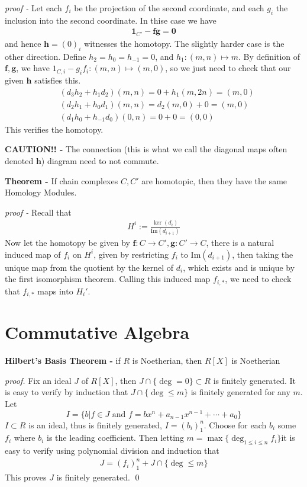 \documentclass[11pt]{article}
\theoremstyle{definition}
\newcommand{\set}[1]{\{#1\}}
\newcommand{\tand}{\text{ and }}
\newcommand{\im}{\text{Im}}
\begin{document}
    \emph{proof - } Let each \(f_i\) be the projection of the second coordinate, and each \(g_i\) the inclusion into the second coordinate. In thise case we have
    \begin{align*}
        \mathbf{1}_{C'} - \mathbf{fg} = \mathbf{0}
    \end{align*}
    and hence \(\mathbf{h} = (0)_i\) witnesses the homotopy. The slightly harder case is the other direction. Define \(h_2 = h_0 = h_{-1} = 0\), and \(h_1: (m,n) \mapsto m\). By definition of \(\mathbf{f}, \mathbf{g}\), we have \(1_{C,i} - g_if_i: (m,n) \mapsto (m,0)\), so we just need to check that our given \(\mathbf{h}\) satisfies this.
    \begin{align*}
        &(d_3h_2 + h_1d_2)(m,n) = 0 + h_1(m,2n) = (m,0) \\
        &(d_2h_1 + h_0d_1)(m,n) = d_2(m,0) + 0 = (m,0) \\
        &(d_1h_0 + h_{-1}d_0)(0,n) = 0 + 0 = (0,0)
    \end{align*}
    This verifies the homotopy.

    \textbf{CAUTION!! - } The connection (this is what we call the diagonal maps often denoted \(\mathbf{h}\)) diagram need to not commute.

    \textbf{Theorem - } If chain complexes \(C,C'\) are homotopic, then they have the same Homology Modules.

    \emph{proof - } Recall that
    \begin{align*}
        H^i := \frac{\ker(d_i)}{\im(d_{i+1})}
    \end{align*}
    Now let the homotopy be given by \(\mathbf{f}:C \to C', \mathbf{g}:C' \to C\), there is a natural induced map of \(f_i\) on \(H^i\), given by restricting \(f_i\) to \(\im(d_{i+1})\), then taking the unique map from the quotient by the kernel of \(d_i\), which exists and is unique by the first isomorphism theorem. Calling this induced map \(f_{i,*}\), we need to check that
    \(f_{i,*}\) maps into \(H_i'\).

    \section{Commutative Algebra}

    \textbf{Hilbert's Basis Theorem - } if \(R\) is Noetherian, then \(R[X]\) is Noetherian
    
    \emph{proof.} Fix an ideal \(J\) of \(R[X]\), then \(J \cap \set{\deg = 0} \subset R\) is finitely generated. It is easy to verify by induction that
    \(J \cap \set{\deg \leq m}\) is finitely generated for any \(m\). Let \[I = \set{b \vert f \in J \tand f = bx^n + a_{n-1}x^{n-1} + \cdots + a_0}\]
    \(I \subset R\) is an ideal, thus is finitely generated, \(I = (b_i)_1^n\). Choose for each \(b_i\) some \(f_i\) where \(b_i\) is the leading coefficient.
    Then letting \(m = \max\set{\deg_{1\leq i\leq n} f_i}\)it is easy to verify using polynomial division and induction that
    \begin{align*}
        J = (f_i)_1^n + J \cap \set{\deg \leq m}
    \end{align*}
    This proves \(J\) is finitely generated. \qed
\end{document}
